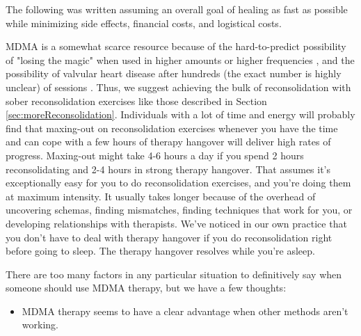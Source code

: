 \documentclass[12pt,letterpaper]{book}
\begin{document}
The following was written assuming an overall goal of healing as fast as possible while minimizing side effects, financial costs, and logistical costs.

MDMA is a somewhat scarce resource because of the hard-to-predict possibility of "losing the magic" when used in higher amounts or higher frequencies \cite{farreTolerance,parrottTolerance}, and the possibility of valvular heart disease after hundreds (the exact number is highly unclear) of sessions \cite{droogmans2007valvular}. Thus, we suggest achieving the bulk of reconsolidation with sober reconsolidation exercises like those described in Section \ref{sec:moreReconsolidation}. Individuals with a lot of time and energy will probably find that maxing-out on reconsolidation exercises whenever you have the time and can cope with a few hours of therapy hangover will deliver high rates of progress. Maxing-out might take 4-6 hours a day if you spend 2 hours reconsolidating and 2-4 hours in strong therapy hangover. That assumes it's exceptionally easy for you to do reconsolidation exercises, and you're doing them at maximum intensity. It usually takes longer because of the overhead of uncovering schemas, finding mismatches, finding techniques that work for you, or developing relationships with therapists. We've noticed in our own practice that you don't have to deal with therapy hangover if you do reconsolidation right before going to sleep. The therapy hangover resolves while you're asleep.

There are too many factors in any particular situation to definitively say when someone should use MDMA therapy, but we have a few thoughts:
\begin{itemize}
    \item MDMA therapy seems to have a clear advantage when other methods aren't working.
\end{itemize}
\end{document}
